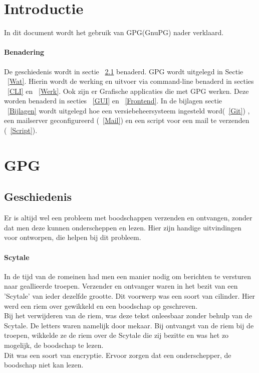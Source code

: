 \documentclass[12pt]{article}
\begin{document}
	\maketitle

	\newpage
	\tableofcontents
	
	\newpage
		\section{Introductie}
			In dit document wordt het gebruik van GPG(GnuPG) nader verklaard.

		\paragraph{Benadering}
			De geschiedenis wordt in sectie ~\ref{Geschiedenis} benaderd.
			GPG wordt uitgelegd in Sectie ~\ref{Wat}.
			Hierin wordt de werking en uitvoer via command-line benaderd in secties ~\ref{CLI} en ~\ref{Werk}.
			Ook zijn er Grafische applicaties die met GPG werken. Deze worden benaderd in secties ~\ref{GUI} en ~\ref{Frontend}.
			In de bijlagen sectie ~\ref{Bijlagen} wordt uitgelegd hoe een versiebeheersysteem ingesteld word(~\ref{Git})
			, een mailserver geconfigureerd (~\ref{Mail}) en een script voor een mail te verzenden (~\ref{Script}).
			

		\newpage
		\section{GPG}\label{GPG}
			\subsection{Geschiedenis}\label{Geschiedenis}
				Er is altijd wel een probleem met boodschappen verzenden en ontvangen, zonder dat men deze kunnen onderscheppen en lezen. Hier zijn handige uitvindingen voor ontworpen, 								die helpen bij dit probleem.

			\paragraph{Scytale}
				In de tijd van de romeinen had men een manier nodig om berichten te versturen naar geallieerde troepen. Verzender en ontvanger waren in het bezit van een 												'Scytale' van ieder dezelfde grootte. Dit voorwerp was een soort van cilinder. Hier werd een riem over gewikkeld en een boodschap op geschreven.\\
				Bij het verwijderen van de riem, was deze tekst onleesbaar zonder behulp van de Scytale. De letters waren namelijk door mekaar. Bij ontvangst van de riem bij de 										troepen, wikkelde ze de riem over de Scytale die zij bezitte en was het zo mogelijk, de boodschap te lezen.\\
				Dit was een soort van encryptie. Ervoor zorgen dat een onderschepper, de boodschap niet kan lezen.
\end{document}
